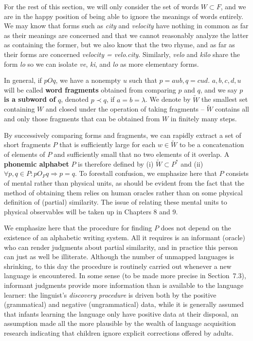 For the rest of this section, we will only consider the set of words $W
\subset F$, and we are in the happy position of being able to ignore the
meanings of words entirely. We may know that forms such as {\it city} and {\it
  velocity} have nothing in common as far as their meanings are concerned and
that we cannot reasonably analyze the latter as containing the former, but we
also know that the two rhyme, and as far as their forms are concerned {\it
  velocity = velo}.{\it city}. Similarly, {\it velo} and {\it kilo} share
the form {\it lo} so we can isolate {\it ve}, {\it ki}, and {\it lo} as more
elementary forms.

In general, if $pOq$, we have a nonempty $u$ such that $p=aub, q=
cud$. $a,b,c,d,u$ will be called {\bf word fragments} obtained from comparing
$p$ and $q$, and we say $p$ {\bf is a subword of} $q$, denoted $p \prec q$, if
$a=b=\lambda$.    We
denote by $\tilde{W}$ the smallest set containing $W$ and closed under the
operation of taking fragments -- $\tilde{W}$ contains all and only those
fragments that can be obtained from $W$ in finitely many steps.

By successively comparing forms and fragments, we can rapidly extract a set of
short fragments $P$ that is sufficiently large for each $w \in \tilde{W}$ to
be a concatenation of elements of $P$ and sufficiently small that no two
elements of it overlap.  A {\bf phonemic alphabet} $P$ is therefore defined by
(i) $\tilde{W} \subset P^*$ and (ii) $\forall p,q \in P: p O_F q \Rightarrow
p=q$.  To forestall confusion, we emphasize here that $P$ consists of mental
rather than physical units, as should be evident from the fact that the method
of obtaining them relies on human oracles rather than on some physical
definition of (partial) similarity. The issue of relating these mental units
to physical observables will be taken up in Chapters 8 and 9. 

We emphasize here that the procedure for finding $P$ does not depend on the
existence of an alphabetic writing system. All it requires is an informant
(oracle) who can render judgments about partial similarity, and in practice
this person can just as well be illiterate. Although
the number of unmapped languages is shrinking, to this day the procedure is
routinely carried out whenever a new language is encountered. In some sense
(to be made more precise in Section~7.3), informant judgments provide more
information than is available to the language learner: the linguist's {\it
  discovery procedure} is driven both by the
positive (grammatical) and negative (ungrammatical) data, while it is
generally assumed that infants learning the language only have positive data
at their disposal, an assumption made all the more plausible by the wealth of
language acquisition research indicating that children ignore explicit
corrections offered by adults.

